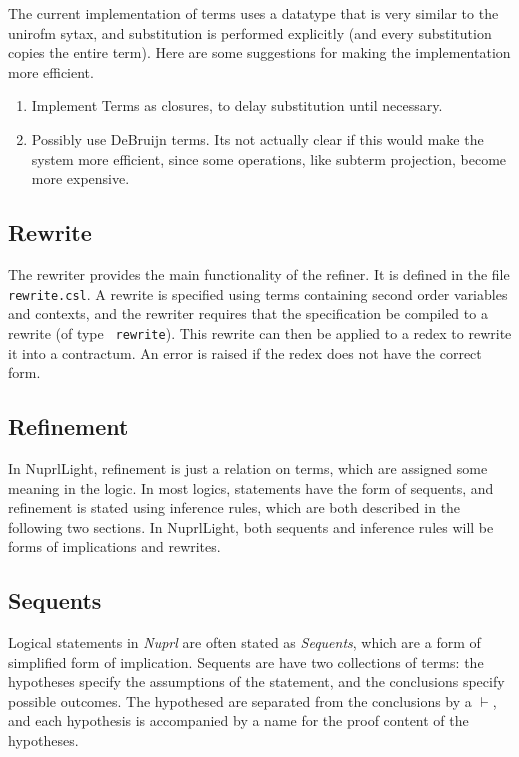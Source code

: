 \documentclass{article}
\newcommand\Nuprl{{\it Nuprl}}
\newcommand\NuprlLight{NuprlLight}
\begin{document}
The current implementation of terms uses a datatype that is very similar to the unirofm sytax, and
substitution is performed explicitly (and every substitution copies the entire term).  Here are
some suggestions for making the implementation more efficient.

\begin{enumerate}
\item
Implement Terms as closures, to delay substitution until necessary.
\item
Possibly use DeBruijn terms.  Its not actually clear if this would make the system more 
efficient, since some operations, like subterm projection, become more expensive.
\end{enumerate}

\subsection{Rewrite}

The rewriter provides the main functionality of the refiner.  It is defined in the file {\tt
  rewrite.csl}.  A rewrite is specified using terms containing second order variables and contexts,
  and the rewriter requires that the specification be compiled to a rewrite (of type {\tt
  rewrite}).  This rewrite can then be applied to a redex to rewrite it into a contractum.  An
  error is raised if the redex does not have the correct form.

\subsection{Refinement}

In \NuprlLight{}, refinement is just a relation on terms, which are assigned some meaning in the 
logic.  In most logics, statements have the form of sequents, and refinement is stated using inference 
rules, which are both described in the following two sections. In \NuprlLight{}, both sequents and 
inference rules will be forms of implications and rewrites.

\subsection{Sequents}

\label{section:sequents}
Logical statements in \Nuprl{} are often stated as {\em Sequents}, which are a form of simplified
form of implication.  Sequents are have two collections of terms: the hypotheses specify the
assumptions of the statement, and the conclusions specify possible outcomes. The hypothesed are
separated from the conclusions by a $\vdash$, and each hypothesis is accompanied by a name for the
proof content of the hypotheses.
\end{document}
